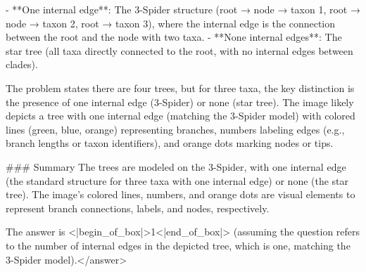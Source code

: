 - **One internal edge**: The 3-Spider structure (root → node → taxon 1, root → node → taxon 2, root → taxon 3), where the internal edge is the connection between the root and the node with two taxa.  
- **None internal edges**: The star tree (all taxa directly connected to the root, with no internal edges between clades).  

The problem states there are four trees, but for three taxa, the key distinction is the presence of one internal edge (3-Spider) or none (star tree). The image likely depicts a tree with one internal edge (matching the 3-Spider model) with colored lines (green, blue, orange) representing branches, numbers labeling edges (e.g., branch lengths or taxon identifiers), and orange dots marking nodes or tips.  

### Summary  
The trees are modeled on the 3-Spider, with one internal edge (the standard structure for three taxa with one internal edge) or none (the star tree). The image’s colored lines, numbers, and orange dots are visual elements to represent branch connections, labels, and nodes, respectively.  

The answer is <|begin_of_box|>1<|end_of_box|> (assuming the question refers to the number of internal edges in the depicted tree, which is one, matching the 3-Spider model).</answer>